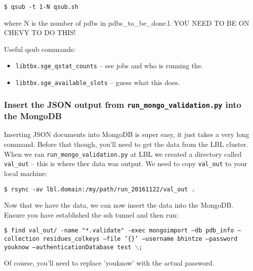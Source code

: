 \documentclass[12pt]{article}
\begin{document}
\vspace{2mm}
\noindent
\texttt{\$ qsub -t 1-N qsub.sh}

\vspace{2mm}
\noindent
where N is the number of pdbs in pdbs\_to\_be\_done.l. YOU NEED TO BE ON CHEVY TO DO THIS!

\vspace{10mm}
\noindent
Useful qsub commands:
\begin{itemize}
  \item \texttt{libtbx.sge\_qstat\_counts} -- see jobs and who is running the.
  \item \texttt{libtbx.sge\_available\_slots} -- guess what this does.
\end{itemize}
\subsubsection*{Insert the JSON output from \texttt{run\_mongo\_validation.py} into the MongoDB}

Inserting JSON documents into MongoDB is super easy, it just takes a very long command. Before that though, you'll need to get the data from the LBL cluster. When we ran \texttt{run\_mongo\_validation.py} at LBL we created a directory called \texttt{val\_out} -- this is where ther data was output. We need to copy \texttt{val\_out} to your local machine:

\vspace{2mm}
\noindent
\texttt{\$ rsync -av lbl.domain:/my/path/run\_20161122/val\_out .}

\vspace{5mm}
\noindent
Now that we have the data, we can now insert the data into the MongoDB. Ensure you have established the ssh tunnel and then run:

\vspace{2mm}
\noindent
\texttt{\$ find val\_out/ -name "*.validate" -exec mongoimport --db pdb\_info --collection residues\_colkeys  --file '\{\}' --username bhintze --password youknow --authenticationDatabase test $\backslash$;}

\vspace{5mm}
\noindent
Of course, you'll need to replace 'youknow' with the actual password.
\end{document}
